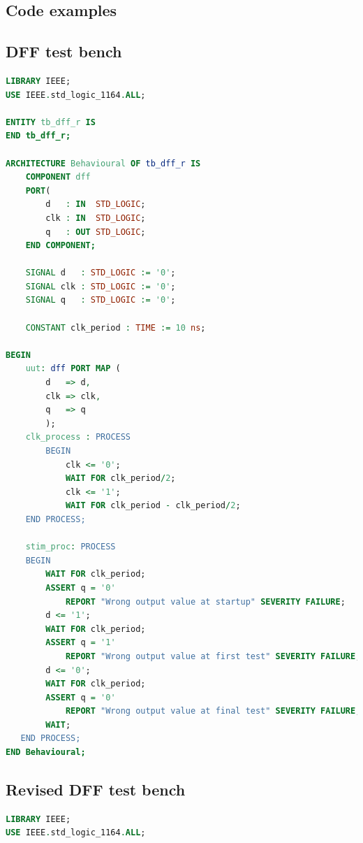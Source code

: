 \documentclass[11pt,british]{article}
\begin{document}
\pagebreak{}
\printbibliography[heading=bibintoc]



\newpage{}

\begin{appendices}

\section{Code examples}
\subsection{DFF test bench}
\label{app:dfftestbench}

\begin{lstlisting}[language=VHDL, tabsize=4, frame=single, framesep=2mm, belowskip=4pt, aboveskip=4pt, showstringspaces=false, basicstyle=\scriptsize]
LIBRARY IEEE;
USE IEEE.std_logic_1164.ALL;

ENTITY tb_dff_r IS
END tb_dff_r;

ARCHITECTURE Behavioural OF tb_dff_r IS
	COMPONENT dff
    PORT(
		d 	: IN  STD_LOGIC;
        clk : IN  STD_LOGIC;
		q 	: OUT STD_LOGIC;
    END COMPONENT;
    
	SIGNAL d   : STD_LOGIC := '0';
	SIGNAL clk : STD_LOGIC := '0';
	SIGNAL q   : STD_LOGIC := '0';

	CONSTANT clk_period : TIME := 10 ns;
	
BEGIN
	uut: dff PORT MAP (
        d 	=> d,
        clk => clk,
		q 	=> q
        );
	clk_process : PROCESS
		BEGIN
			clk <= '0';
			WAIT FOR clk_period/2;
			clk <= '1';
			WAIT FOR clk_period - clk_period/2;
	END PROCESS;
	
	stim_proc: PROCESS
	BEGIN		
     	WAIT FOR clk_period;
     	ASSERT q = '0'
			REPORT "Wrong output value at startup" SEVERITY FAILURE;
		d <= '1';
     	WAIT FOR clk_period;
     	ASSERT q = '1'
			REPORT "Wrong output value at first test" SEVERITY FAILURE;
		d <= '0';
     	WAIT FOR clk_period;
     	ASSERT q = '0'
			REPORT "Wrong output value at final test" SEVERITY FAILURE;
		WAIT;
   END PROCESS;
END Behavioural;
\end{lstlisting}

\newpage{}
\subsection{Revised DFF test bench}
\label{app:dfftestbench2}
\begin{lstlisting}[language=VHDL, tabsize=4, frame=single, framesep=2mm, belowskip=4pt, aboveskip=4pt, showstringspaces=false, basicstyle=\scriptsize]
LIBRARY IEEE;
USE IEEE.std_logic_1164.ALL;


\end{lstlisting}
\end{appendices}
\end{document}
